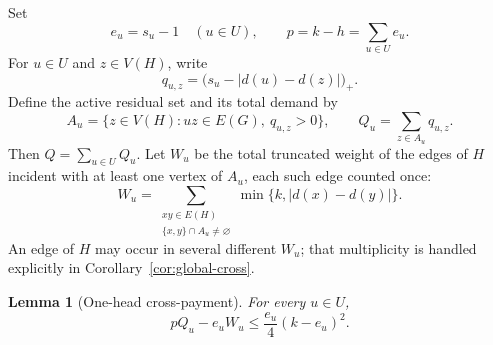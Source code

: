 \documentclass[a4paper,11pt]{amsart}
\numberwithin{equation}{section}
\newtheorem{lemma}[theorem]{Lemma}
\theoremstyle{definition}
\theoremstyle{remark}
\begin{document}
Set
\begin{equation}
e_u=s_u-1\quad(u\in U),
\qquad
p=k-h=\sum_{u\in U}e_u.
\label{eq:e-p}
\end{equation}
For $u\in U$ and $z\in V(H)$, write
\begin{equation}
q_{u,z}=\bigl(s_u-\lvert d(u)-d(z)\rvert\bigr)_+.
\end{equation}
Define the active residual set and its total demand by
\begin{equation}
A_u=\{z\in V(H):uz\in E(G),\ q_{u,z}>0\},
\qquad
Q_u=\sum_{z\in A_u}q_{u,z}.
\label{eq:A-Qu}
\end{equation}
Then $Q=\sum_{u\in U}Q_u$.  Let $W_u$ be the total truncated weight of the edges of $H$ incident with at least one vertex of $A_u$, each such edge counted once:
\begin{equation}
W_u=\sum_{\substack{xy\in E(H)\\\{x,y\}\cap A_u\ne\varnothing}}
       \min\{k,\lvert d(x)-d(y)\rvert\}.
\label{eq:Wu}
\end{equation}
An edge of $H$ may occur in several different $W_u$; that multiplicity is handled explicitly in Corollary~\ref{cor:global-cross}.

\begin{lemma}[One-head cross-payment]\label{lem:one-head-cross}
For every $u\in U$,
\begin{equation}
pQ_u-e_uW_u\le \frac{e_u}{4}(k-e_u)^2.
\label{eq:one-head-final}
\end{equation}
\end{lemma}
\end{document}
